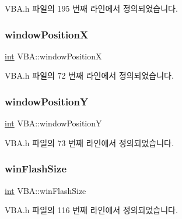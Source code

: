 V\+B\+A.\+h 파일의 195 번째 라인에서 정의되었습니다.

\mbox{\label{class_v_b_a_a5f9fb2744603deedbe9f8a77a7a2cf91}} 
\subsubsection{\texorpdfstring{window\+PositionX}{windowPositionX}}
{\footnotesize\ttfamily \mbox{\hyperlink{_util_8cpp_a0ef32aa8672df19503a49fab2d0c8071}{int}} V\+B\+A\+::window\+PositionX}



V\+B\+A.\+h 파일의 72 번째 라인에서 정의되었습니다.

\mbox{\label{class_v_b_a_a79b40ebb7ccfd4390eb0747168d07cad}} 
\subsubsection{\texorpdfstring{window\+PositionY}{windowPositionY}}
{\footnotesize\ttfamily \mbox{\hyperlink{_util_8cpp_a0ef32aa8672df19503a49fab2d0c8071}{int}} V\+B\+A\+::window\+PositionY}



V\+B\+A.\+h 파일의 73 번째 라인에서 정의되었습니다.

\mbox{\label{class_v_b_a_a5c99844bc4d1e5556434afaa75ae91e5}} 
\subsubsection{\texorpdfstring{win\+Flash\+Size}{winFlashSize}}
{\footnotesize\ttfamily \mbox{\hyperlink{_util_8cpp_a0ef32aa8672df19503a49fab2d0c8071}{int}} V\+B\+A\+::win\+Flash\+Size}



V\+B\+A.\+h 파일의 116 번째 라인에서 정의되었습니다.

\mbox{\label{class_v_b_a_afacb46f54fb546d8d97055dc535b074e}} 
